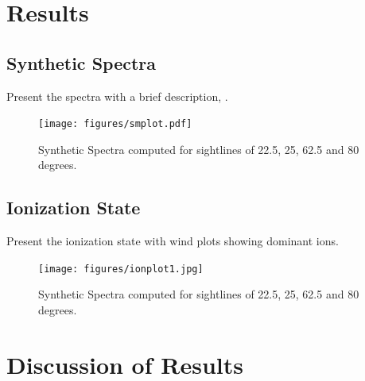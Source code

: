\documentclass[preprint, a4paper, 11pt]{aastex}
\begin{document}


\newpage
\bigskip
\bigskip

%
%

\section{Results}

\subsection{Synthetic Spectra}
Present the spectra with a brief description, .

\begin{figure}
\texttt{[image: figures/smplot.pdf]}
\caption{Synthetic Spectra computed for sightlines of 22.5, 25, 62.5 and 80 degrees.}
\end{figure}

\subsection{Ionization State}
Present the ionization state with wind plots showing dominant ions.

\begin{figure}
\texttt{[image: figures/ionplot1.jpg]}
\caption{Synthetic Spectra computed for sightlines of 22.5, 25, 62.5 and 80 degrees.}
\end{figure}



\newpage
%
%

\section{Discussion of Results}
\end{document}
